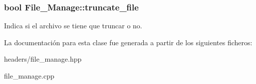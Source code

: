 \subsubsection[{\texorpdfstring{truncate\+\_\+file}{truncate_file}}]{\setlength{\rightskip}{0pt plus 5cm}bool File\+\_\+\+Manage\+::truncate\+\_\+file\hspace{0.3cm}{\ttfamily [protected]}}\hypertarget{class_file___manage_a598d159493673c0864cd0873816f33a8}{}\label{class_file___manage_a598d159493673c0864cd0873816f33a8}
Indica si el archivo se tiene que truncar o no. 

La documentación para esta clase fue generada a partir de los siguientes ficheros\+:\begin{DoxyCompactItemize}
\item 
headers/file\+\_\+manage.\+hpp\item 
file\+\_\+manage.\+cpp\end{DoxyCompactItemize}
